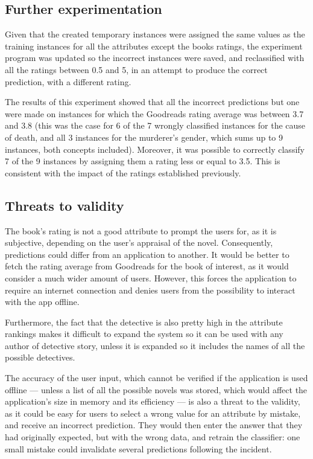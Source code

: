 \documentclass{mproj}
\begin{document}
\subsection*{Further experimentation}

Given that the created temporary instances were assigned the same values as the training instances for all the attributes except the books ratings, the experiment program was updated so the incorrect instances were saved, and reclassified with all the ratings between 0.5 and 5, in an attempt to produce the correct prediction, with a different rating.

The results of this experiment showed that all the incorrect predictions but one were made on instances for which the Goodreads rating average was between 3.7 and 3.8 (this was the case for 6 of the 7 wrongly classified instances for the cause of death, and all 3 instances for the murderer's gender, which sums up to 9 instances, both concepts included). Moreover, it was possible to correctly classify 7 of the 9 instances by assigning them a rating less or equal to 3.5. This is consistent with the impact of the ratings established previously.

\subsection*{Threats to validity}

The book's rating is not a good attribute to prompt the users for, as it is subjective, depending on the user's appraisal of the novel. Consequently, predictions could differ from an application to another. It would be better to fetch the rating average from Goodreads for the book of interest, as it would consider a much wider amount of users. However, this forces the application to require an internet connection and denies users from the possibility to interact with the app offline.

Furthermore, the fact that the detective is also pretty high in the attribute rankings makes it difficult to expand the system so it can be used with any author of detective story, unless it is expanded so it includes the names of all the possible detectives.

The accuracy of the user input, which cannot be verified if the application is used offline --- unless a list of all the possible novels was stored, which would affect the application's size in memory and its efficiency --- is also a threat to the validity, as it could be easy for users to select a wrong value for an attribute by mistake, and receive an incorrect prediction. They would then enter the answer that they had originally expected, but with the wrong data, and retrain the classifier: one small mistake could invalidate several predictions following the incident.
\end{document}

